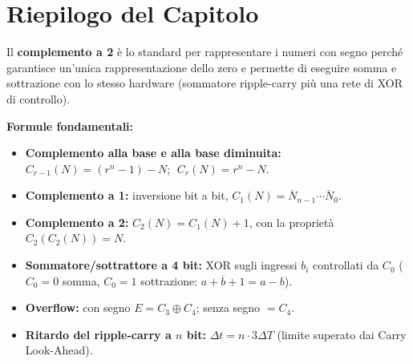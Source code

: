 \begin{center}
\end{center}

\section*{Riepilogo del Capitolo}

\begin{important}
Il \textbf{complemento a 2} è lo standard per rappresentare i numeri con segno perché garantisce un'unica rappresentazione dello zero e permette di eseguire somma e sottrazione con lo stesso hardware (sommatore ripple-carry più una rete di XOR di controllo).
\end{important}

\begin{note}
\textbf{Formule fondamentali:}
\begin{itemize}
    \item \textbf{Complemento alla base e alla base diminuita:} $C_{r-1}(N) = (r^n-1)-N$; $\; C_r(N) = r^n - N$.
    \item \textbf{Complemento a 1:} inversione bit a bit, $C_1(N) = \overline{N}_{n-1}\cdots\overline{N}_0$.
    \item \textbf{Complemento a 2:} $C_2(N) = C_1(N)+1$, con la proprietà $C_2(C_2(N))=N$.
    \item \textbf{Sommatore/sottrattore a 4 bit:} XOR sugli ingressi $b_i$ controllati da $C_0$ ($C_0=0$ somma, $C_0=1$ sottrazione: $a+\overline{b}+1=a-b$).
    \item \textbf{Overflow:} con segno $E = C_3\oplus C_4$; senza segno $= C_4$.
    \item \textbf{Ritardo del ripple-carry a $n$ bit:} $\Delta t = n\cdot 3\Delta T$ (limite superato dai Carry Look-Ahead).
\end{itemize}
\end{note}

